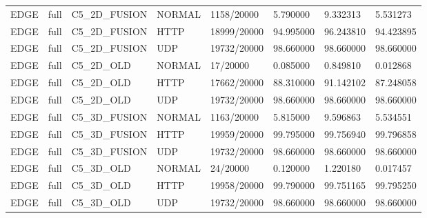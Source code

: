 \begin{tabular}{llllllll}
EDGE & full & C5\_2D\_FUSION & NORMAL & 1158/20000 & 5.790000 & 9.332313 & 5.531273 \\
EDGE & full & C5\_2D\_FUSION & HTTP & 18999/20000 & 94.995000 & 96.243810 & 94.423895 \\
EDGE & full & C5\_2D\_FUSION & UDP & 19732/20000 & 98.660000 & 98.660000 & 98.660000 \\
EDGE & full & C5\_2D\_OLD & NORMAL & 17/20000 & 0.085000 & 0.849810 & 0.012868 \\
EDGE & full & C5\_2D\_OLD & HTTP & 17662/20000 & 88.310000 & 91.142102 & 87.248058 \\
EDGE & full & C5\_2D\_OLD & UDP & 19732/20000 & 98.660000 & 98.660000 & 98.660000 \\
EDGE & full & C5\_3D\_FUSION & NORMAL & 1163/20000 & 5.815000 & 9.596863 & 5.534551 \\
EDGE & full & C5\_3D\_FUSION & HTTP & 19959/20000 & 99.795000 & 99.756940 & 99.796858 \\
EDGE & full & C5\_3D\_FUSION & UDP & 19732/20000 & 98.660000 & 98.660000 & 98.660000 \\
EDGE & full & C5\_3D\_OLD & NORMAL & 24/20000 & 0.120000 & 1.220180 & 0.017457 \\
EDGE & full & C5\_3D\_OLD & HTTP & 19958/20000 & 99.790000 & 99.751165 & 99.795250 \\
EDGE & full & C5\_3D\_OLD & UDP & 19732/20000 & 98.660000 & 98.660000 & 98.660000 \\
\hline
\end{tabular}
